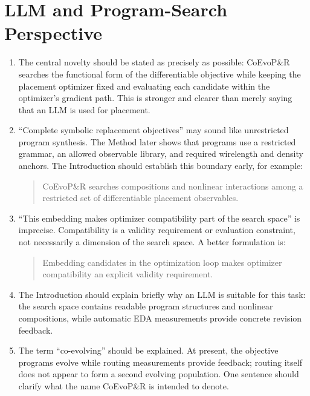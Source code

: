 \documentclass[11pt]{article}
\begin{document}
\section{LLM and Program-Search Perspective}

\begin{enumerate}
  \item The central novelty should be stated as precisely as possible:
  CoEvoP\&R searches the functional form of the differentiable objective while
  keeping the placement optimizer fixed and evaluating each candidate within
  the optimizer's gradient path. This is stronger and clearer than merely
  saying that an LLM is used for placement.

  \item ``Complete symbolic replacement objectives'' may sound like
  unrestricted program synthesis. The Method later shows that programs use a
  restricted grammar, an allowed observable library, and required wirelength
  and density anchors. The Introduction should establish this boundary early,
  for example:

  \begin{quote}
  CoEvoP\&R searches compositions and nonlinear interactions among a
  restricted set of differentiable placement observables.
  \end{quote}

  \item ``This embedding makes optimizer compatibility part of the search
  space'' is imprecise. Compatibility is a validity requirement or evaluation
  constraint, not necessarily a dimension of the search space. A better
  formulation is:

  \begin{quote}
  Embedding candidates in the optimization loop makes optimizer compatibility
  an explicit validity requirement.
  \end{quote}

  \item The Introduction should explain briefly why an LLM is suitable for
  this task: the search space contains readable program structures and
  nonlinear compositions, while automatic EDA measurements provide concrete
  revision feedback.

  \item The term ``co-evolving'' should be explained. At present, the objective
  programs evolve while routing measurements provide feedback; routing itself
  does not appear to form a second evolving population. One sentence should
  clarify what the name CoEvoP\&R is intended to denote.
\end{enumerate}
\end{document}
